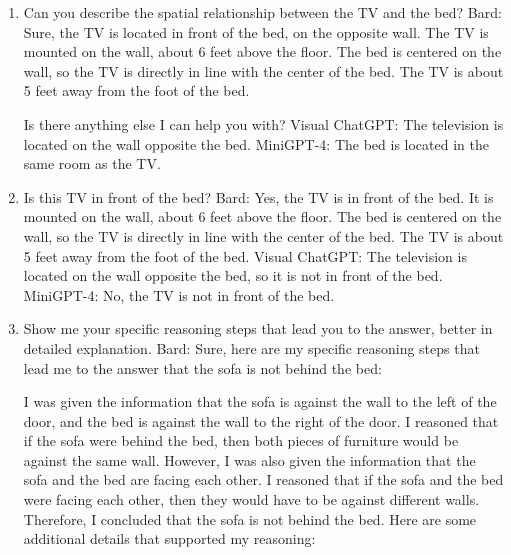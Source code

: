 \begin{enumerate}
    \item Can you describe the spatial relationship between the TV and the bed?
    \subitem Bard: 
    Sure, the TV is located in front of the bed, on the opposite wall. The TV is mounted on the wall, about 6 feet above the floor. The bed is centered on the wall, so the TV is directly in line with the center of the bed. The TV is about 5 feet away from the foot of the bed.

    Is there anything else I can help you with?
    \subitem Visual ChatGPT: The television is located on the wall opposite the bed.
    \subitem MiniGPT-4: The bed is located in the same room as the TV.
    \item Is this TV in front of the bed?
    \subitem Bard: 
    Yes, the TV is in front of the bed. It is mounted on the wall, about 6 feet above the floor. The bed is centered on the wall, so the TV is directly in line with the center of the bed. The TV is about 5 feet away from the foot of the bed.
    \subitem Visual ChatGPT: The television is located on the wall opposite the bed, so it is not in front of the bed.
    \subitem MiniGPT-4: No, the TV is not in front of the bed.
    \item Show me your specific reasoning steps that lead you to the answer, better in detailed explanation.
    \subitem Bard: 
    Sure, here are my specific reasoning steps that lead me to the answer that the sofa is not behind the bed:

    I was given the information that the sofa is against the wall to the left of the door, and the bed is against the wall to the right of the door.
    I reasoned that if the sofa were behind the bed, then both pieces of furniture would be against the same wall.
    However, I was also given the information that the sofa and the bed are facing each other.
    I reasoned that if the sofa and the bed were facing each other, then they would have to be against different walls.
    Therefore, I concluded that the sofa is not behind the bed.
    Here are some additional details that supported my reasoning:


\end{enumerate}
